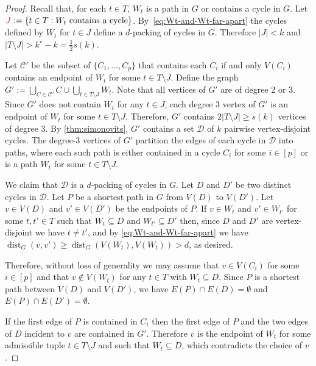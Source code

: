 \documentclass{patmorin}
\newcommand{\pat}[1]{\textcolor{Blue}{[Pat: #1]}}
\newcommand{\gwen}[1]{\textcolor{Purple}{Gwen: #1}}
\DeclareMathOperator{\dist}{dist}
\begin{document}
\begin{proof}
Recall that, for each $t\in T$, $W_t$ is a path in $G$ or contains a cycle in $G$.
Let $\mathdefin{J}:=\{t\in T:\text{$W_t$ contains a cycle}\}$.  By~\eqref{eq:Wt-and-Wt-far-apart} the cycles defined by $W_t$ for $t\in J$ define a $d$-packing of cycles in $G$.  Therefore $|J|<k$ and $|T\setminus J|> k^\star-k= \tfrac{1}{2}s(k)$.

Let $\mathcal{C}'$ be the subset of $\{C_1,\ldots,C_p\}$ that contains each $C_i$ if and only $V(C_i)$ contains an endpoint of $W_t$ for some $t\in T\setminus J$.  Define the graph $G':=\bigcup_{C\in\mathcal{C}'} C\cup \bigcup_{t\in T\setminus J} W_{t}$.
Note that all vertices of $G'$ are of degree $2$ or $3$.  Since $G'$ does not contain $W_t$ for any $t\in J$, each degree $3$ vertex of $G'$ is an endpoint of $W_{t}$ for some $t\in T\setminus J$.
Therefore, $G'$ contains $2|T\setminus J|\geq s(k)$ vertices of degree $3$.
By \cref{thm:simonovits}, $G'$ contains a set $\mathcal{D}$ of $k$ pairwise vertex-disjoint cycles.  The degree-$3$ vertices of $G'$ partition the edges of each cycle in $\mathcal{D}$ into paths, where each such path is either contained in a cycle $C_i$ for some $i\in[p]$ or is a path $W_t$ for some $t\in T\setminus J$.

We claim that $\mathcal{D}$ is a $d$-packing of cycles in $G$.
Let $D$ and $D'$ be two distinct cycles in $\mathcal{D}$.  Let $P$ be a shortest path in $G$ from $V(D)$ to $V(D')$.  Let $v\in V(D)$ and $v'\in V(D')$ be the endpoints of $P$.  If $v\in W_t$ and $v'\in W_{t'}$ for some $t,t'\in T$ such that $W_t\subseteq D$ and $W_{t'}\subseteq D'$ then,
since $D$ and $D'$ are vertex-disjoint we have $t\neq t'$, and by \eqref{eq:Wt-and-Wt-far-apart} we have $\dist_G(v,v')\ge \dist_G(V(W_t),V(W_t))>d$, as desired.

Therefore, without loss of generality we may assume that $v\in V(C_i)$ for some $i\in[p]$ and that $v\notin V(W_t)$ for any $t\in T$ with $W_t\subseteq D$.  Since $P$ is a shortest path between $V(D)$ and $V(D')$, we have $E(P)\cap E(D)=\emptyset$ and $E(P)\cap E(D')=\emptyset$.

If the first edge of $P$ is contained in $C_i$ then the first edge of $P$ and the two edges of $D$ incident to $v$ are contained in $G'$.  Therefore $v$ is the endpoint of $W_t$ for some admissible tuple $t\in T\setminus J$ and such that $W_t\subseteq D$, which contradicts the choice of $v$.



\end{proof}
\end{document}
